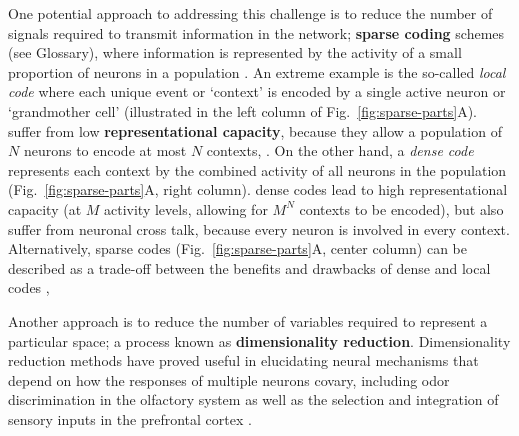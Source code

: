 One potential approach to addressing this challenge is to
reduce the number of signals required to transmit information in the network;
 \textbf{sparse coding} schemes (see Glossary),
where information is represented by the activity of a small
proportion of neurons in a population
\cite{Foldiak1990,Field1994,LevyBaxter1996}.
An extreme example is the so-called \emph{local code}
where each unique event or `context' is encoded by a single active neuron
or `grandmother cell' \cite{RollsTreves1990}
(illustrated in the left column of Fig.~\ref{fig:sparse-parts}A).
 suffer from low \textbf{representational capacity},
because they allow a population of $N$ neurons to encode at most $N$ contexts,
.
On the other hand, a \emph{dense code}
represents each context by the combined activity
of all neurons in the population
(Fig.~\ref{fig:sparse-parts}A, right column).
dense codes lead to high representational capacity
(at $M$ activity levels, allowing for $M^N$ contexts to be encoded),
but also suffer from neuronal cross talk,
because every neuron is involved in every context.
Alternatively, sparse codes
(Fig.~\ref{fig:sparse-parts}A, center column)
can be described as a trade-off between the benefits and
drawbacks of dense and local codes 
\cite{SpanneJorntell2015,Foldiak1990},






Another approach is to reduce the number of
variables required to represent a particular  space;
a process known as
\textbf{dimensionality reduction}.
Dimensionality reduction methods have proved useful in elucidating neural mechanisms
that depend on how the responses of multiple neurons covary,
including odor discrimination in the olfactory system \cite{Broome2006,Koulakov2011}
as well as the selection and integration of sensory inputs 
in the prefrontal cortex \cite{Mante2013,CunninghamYu2014}.

